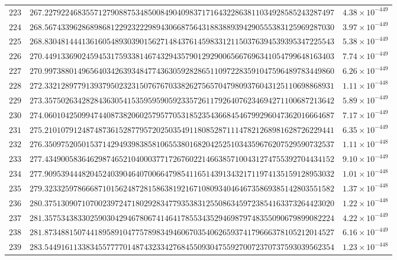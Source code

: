 \documentclass[12pt,reqno]{amsart}
\theoremstyle{remark}
\begin{document}
\begin{longtable}{clc}
$223$ & $267.2279224683557127908875348500849040983717164322863811034928585243287497$ & $4.38\times 10^{-449}$ \\
$224$ & $268.5674339628689868122923222989430668756431883889394290555383125969287030$ & $3.97\times 10^{-449}$ \\
$225$ & $268.8304814441361605489303901562714843761459833121150376394539395347225543$ & $5.38\times 10^{-449}$ \\
$226$ & $270.4491336902459453175933814674329435790129290065667696341054799648163403$ & $7.74\times 10^{-449}$ \\
$227$ & $270.9973880149656403426393484774363059282865110972283591047596489783449860$ & $6.26\times 10^{-449}$ \\
$228$ & $272.3321289779139379502323150767670338262756570479809376043125110698868931$ & $1.11\times 10^{-448}$ \\
$229$ & $273.3575026342828436305415359595905923357261179264076234694271100687213642$ & $5.89\times 10^{-449}$ \\
$230$ & $274.0601042509947440873820602579577053185235436684546799296047362016664687$ & $7.17\times 10^{-449}$ \\
$231$ & $275.2101079124874873615287795720250354911808528711147821268981628726229441$ & $6.35\times 10^{-449}$ \\
$232$ & $276.3509752050153714294939838581065538016820425251034359676207529590732537$ & $1.11\times 10^{-448}$ \\
$233$ & $277.4349005836462987465210400037717267602214663857100431274755392704434152$ & $9.10\times 10^{-449}$ \\
$234$ & $277.9095394448204524039046407006647985411651439134321711974135159128953032$ & $1.01\times 10^{-448}$ \\
$235$ & $279.3233259786668710156248728158638192167108093404646735869385142803551582$ & $1.37\times 10^{-448}$ \\
$236$ & $280.3751309071070023972471802928347793538312550863459723854163373264423020$ & $1.22\times 10^{-448}$ \\
$237$ & $281.3575343833025903042946780674146417855343529469879748355090679899082224$ & $4.22\times 10^{-449}$ \\
$238$ & $281.8734881507441895891047757898349460670354062659374179666378105212014527$ & $6.16\times 10^{-449}$ \\
$239$ & $283.5449161133834557777014874323342768455093047559270072370737593039562354$ & $1.23\times 10^{-448}$ \\

\end{longtable}
\end{document}
